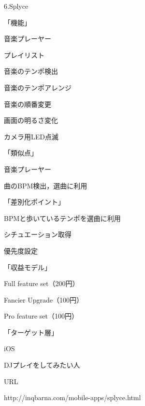 \par
6.Splyce
\par
「機能」
\par
音楽プレーヤー
\par
プレイリスト
\par
音楽のテンポ検出
\par
音楽のテンポアレンジ
\par
音楽の順番変更
\par
画面の明るさ変化
\par
カメラ用LED点滅
\par
「類似点」
\par
音楽プレーヤー
\par
曲のBPM検出，選曲に利用
\par
「差別化ポイント」
\par
BPMと歩いているテンポを選曲に利用
\par
シチュエーション取得
\par
優先度設定
\par
「収益モデル」
\par
Full feature set（200円）
\par
Fancier Upgrade（100円）
\par
Pro feature set（100円）
\par
「ターゲット層」
\par
iOS
\par
DJプレイをしてみたい人
\par
URL
\par
http://inqbarna.com/mobile-apps/splyce.html

\\
\par
{}\par

